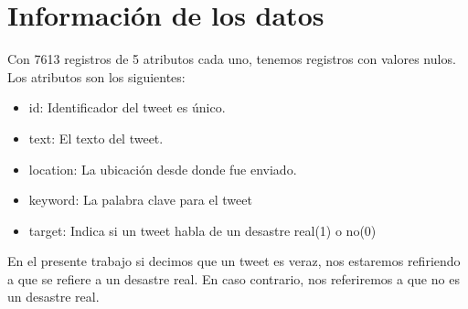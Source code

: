 \documentclass[titlepage,a4paper]{article}
\begin{document}
\section{\Large Información de los datos}\label{sec:infoDatos}
{\Large
Con 7613 registros de 5 atributos cada uno, tenemos registros con valores nulos.\\
Los atributos son los siguientes:
\begin{itemize}
    \item id: Identificador del tweet es único.
    \item text: El texto del tweet.
    \item location: La ubicación desde donde fue enviado.
    \item keyword: La palabra clave para el tweet
    \item target: Indica si un tweet habla de un desastre real(1) o no(0)
\end{itemize}
En el presente trabajo si decimos que un tweet es veraz, nos estaremos refiriendo a que se refiere a un desastre real. En caso contrario, nos referiremos a que no es un desastre real.
\par}
\end{document}
